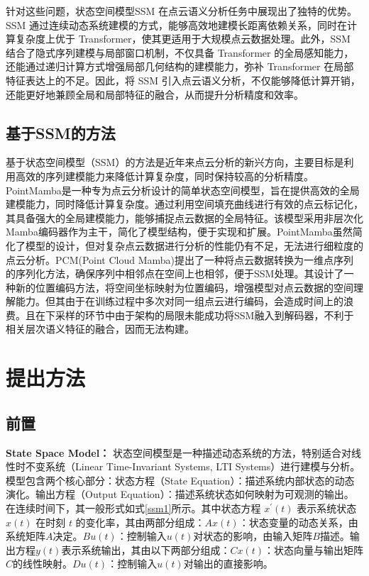 \documentclass[preprint,12pt]{elsarticle}
\begin{document}
针对这些问题，状态空间模型SSM 在点云语义分析任务中展现出了独特的优势。SSM 通过连续动态系统建模的方式，能够高效地建模长距离依赖关系，同时在计算复杂度上优于 Transformer，使其更适用于大规模点云数据处理。此外，SSM 结合了隐式序列建模与局部窗口机制，不仅具备 Transformer 的全局感知能力，还能通过递归计算方式增强局部几何结构的建模能力，弥补 Transformer 在局部特征表达上的不足。因此，将 SSM 引入点云语义分析，不仅能够降低计算开销，还能更好地兼顾全局和局部特征的融合，从而提升分析精度和效率。

\subsection{基于SSM的方法}
基于状态空间模型（SSM）的方法是近年来点云分析的新兴方向，主要目标是利用高效的序列建模能力来降低计算复杂度，同时保持较高的分析精度。
PointMamba\cite{PointMamba}是一种专为点云分析设计的简单状态空间模型，旨在提供高效的全局建模能力，同时降低计算复杂度。通过利用空间填充曲线进行有效的点云标记化，其具备强大的全局建模能力，能够捕捉点云数据的全局特征。该模型采用非层次化Mamba编码器作为主干，简化了模型结构，便于实现和扩展。PointMamba虽然简化了模型的设计，但对复杂点云数据进行分析的性能仍有不足，无法进行细粒度的点云分析。PCM(Point Cloud Mamba)\cite{pcm}提出了一种将点云数据转换为一维点序列的序列化方法，确保序列中相邻点在空间上也相邻，便于SSM处理。其设计了一种新的位置编码方法，将空间坐标映射为位置编码，增强模型对点云数据的空间理解能力。但其由于在训练过程中多次对同一组点云进行编码，会造成时间上的浪费。且在下采样的环节中由于架构的局限未能成功将SSM融入到解码器，不利于相关层次语义特征的融合，因而无法构建。


\section{提出方法}
\subsection{前置}
\textbf{State Space Model：}
状态空间模型是一种描述动态系统的方法，特别适合对线性时不变系统（Linear Time-Invariant Systems, LTI Systems）进行建模与分析。模型包含两个核心部分：状态方程（State Equation）：描述系统内部状态的动态演化。输出方程（Output Equation）：描述系统状态如何映射为可观测的输出。在连续时间下，其一般形式如式\eqref{ssm1}所示。其中状态方程 $x^{\prime}(t)$ 表示系统状态 $x(t)$ 在时刻 $t$ 的变化率，其由两部分组成：$Ax(t)$：状态变量的动态关系，由系统矩阵$A$决定。$Bu(t)$：控制输入$u(t)$对状态的影响，由输入矩阵$B$描述。输出方程$y(t)$表示系统输出，其由以下两部分组成：$Cx(t)$：状态向量与输出矩阵$C$的线性映射。$Du(t)$：控制输入$u(t)$对输出的直接影响。
\end{document}

